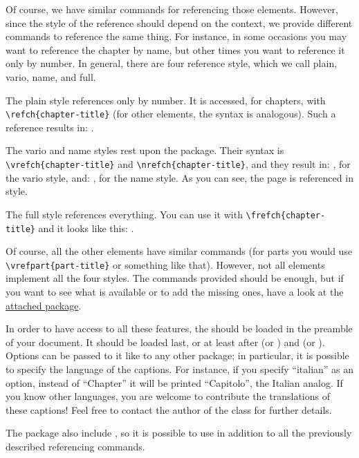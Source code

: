 Of course, we have similar commands for referencing those elements. 
However, since the style of the reference should depend on the context, 
we provide different commands to reference the same thing. For instance, 
in some occasions you may want to reference the chapter by name, but 
other times you want to reference it only by number. In general, there 
are four reference style, which we call plain, vario, name, and full.

The plain style references only by number. It is accessed, for chapters, 
with \lstinline|\refch{chapter-title}| (for other elements, the syntax 
is analogous). Such a reference results in: .

The vario and name styles rest upon the  package. 
Their syntax is \lstinline|\vrefch{chapter-title}| and 
\lstinline|\nrefch{chapter-title}|, and they result in: 
, for the vario style, and: , for 
the name style. As you can see, the page is referenced in 
 style.

The full style references everything. You can use it with 
\lstinline|\frefch{chapter-title}| and it looks like this: 
.

Of course, all the other elements have similar commands (\eg for parts 
you would use \lstinline|\vrefpart{part-title}| or something like that). 
However, not all elements implement all the four styles. The commands 
provided should be enough, but if you want to see what is available or 
to add the missing ones, have a look at the 
\href{styles/kaorefs.sty}{attached package}.

In order to have access to all these features, the  
should be loaded in the preamble of your document. It should be loaded 
last, or at least after  (or ) and 
 (or ). Options can be 
passed to it like to any other package; in particular, it is possible to 
specify the language of the captions. For instance, if you specify 
\enquote{italian} as an option, instead of \enquote{Chapter} it will be 
printed \enquote{Capitolo}, the Italian analog. If you know other 
languages, you are welcome to contribute the translations of these 
captions! Feel free to contact the author of the class for further 
details. 

The  package also include , so it is 
possible to use  in addition to all the previously 
described referencing commands.

